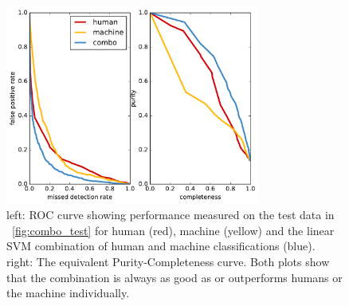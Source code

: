 \documentclass[a4paper,fleqn,usenatbib]{mnras}
\begin{document}
\begin{figure}
   \includegraphics[width=84mm]{figs/roc.pdf}
   \caption{left: ROC curve showing performance measured on the test data in ~\ref{fig:combo_test} for human (red), machine (yellow) and
            the linear SVM combination of human and machine classifications (blue).  right: The equivalent Purity-Completeness curve.  Both
            plots show that the combination is always as good as or outperforms humans or the machine individually.} 
   \label{fig:roc} 
\end{figure}

\bsp	%
\label{lastpage}
\end{document}
